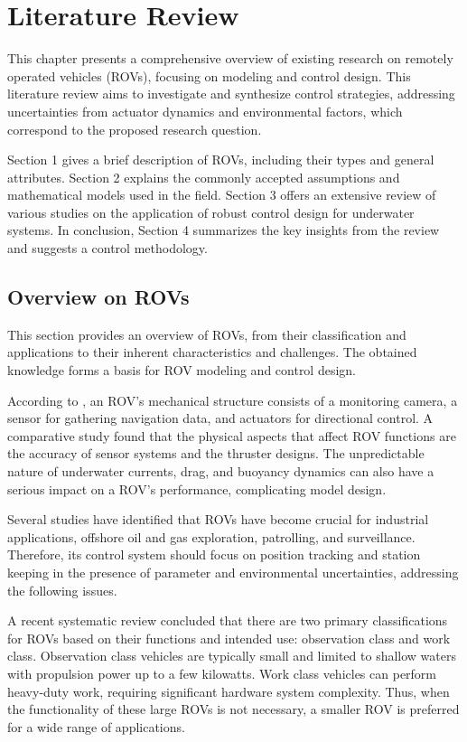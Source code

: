 \chapter{Literature Review}
\label{chap:lr}

This chapter presents a comprehensive overview of existing research on remotely operated vehicles (ROVs), 
focusing on modeling and control design. This literature review aims to investigate and synthesize 
control strategies, addressing uncertainties from actuator dynamics and environmental factors, which 
correspond to the proposed research question.

Section 1 gives a brief description of ROVs, including their types and general attributes. 
Section 2 explains the commonly accepted assumptions and mathematical models used in the field. 
Section 3 offers an extensive review of various studies on the application of robust control 
design for underwater systems. In conclusion, Section 4 summarizes the key insights from the review 
and suggests a control methodology.

\section{Overview on ROVs}

This section provides an overview of ROVs, from their classification and applications to their 
inherent characteristics and challenges. The obtained knowledge forms a basis for ROV modeling 
and control design.

According to \cite{rov_review}, an ROV's mechanical structure consists of a monitoring camera, a sensor 
for gathering navigation data, and actuators for directional control. A 
comparative study \cite{overview} found that the physical aspects that affect ROV functions are the accuracy of 
sensor systems and the thruster designs. The unpredictable nature of underwater currents, drag, 
and buoyancy dynamics can also have a serious impact on a ROV's performance, complicating model 
design.

Several studies \cite{rov_review, overview} have identified that ROVs have become crucial for industrial applications, 
offshore oil and gas exploration, patrolling, and surveillance. Therefore, its control system 
should focus on position tracking and station keeping in the presence of parameter and environmental uncertainties, addressing the following issues.

A recent systematic review \cite{inspection_review} concluded that there are two primary classifications for ROVs based 
on their functions and intended use: observation class and work class. Observation class vehicles 
are typically small and limited to shallow waters with propulsion power up to a few kilowatts. Work 
class vehicles can perform heavy-duty work, requiring significant hardware 
system complexity. Thus, when the functionality of these large 
ROVs is not necessary, a smaller ROV is preferred for a wide range of applications.

